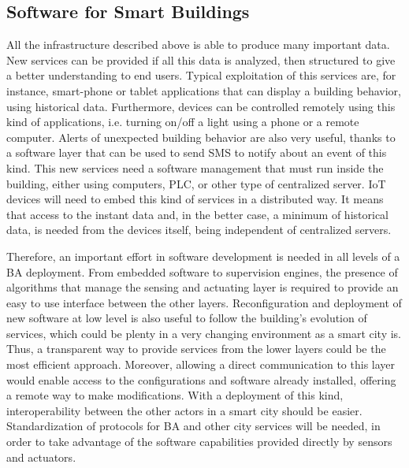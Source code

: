\subsection{Software for Smart Buildings}
All the infrastructure described above is able to produce many important data.
New services can be provided if all this data is analyzed, then structured to give a better understanding to end users.
Typical exploitation of this services are, for instance, smart-phone or tablet applications that can display a building behavior, using historical data.
Furthermore, devices can be controlled remotely using this kind of applications, i.e. turning on/off a light using a phone or a remote computer.
Alerts of unexpected building behavior are also very useful, thanks to a software layer that can be used to send SMS to notify about an event of this kind.
This new services need a software management that must run inside the building, either using computers, PLC, or other type of centralized server.
IoT devices will need to embed this kind of services in a distributed way.
It means that access to the instant data and, in the better case, a minimum of historical data, is needed from the devices itself, being independent of centralized servers.

Therefore, an important effort in software development is needed in all levels of a BA deployment.
From embedded software to supervision engines, the presence of algorithms that manage the sensing and actuating layer is required to provide an easy to use interface between the other layers.
Reconfiguration and deployment of new software at low level is also useful to follow the building's evolution of services, which could be plenty in a very changing environment as a smart city is.
Thus, a transparent way to provide services from the lower layers could be the most efficient approach.
Moreover, allowing a direct communication to this layer would enable access to the configurations and software already installed, offering a remote way to make modifications.
With a deployment of this kind, interoperability between the other actors in a smart city should be easier.
Standardization of protocols for BA and other city services will be needed, in order to take advantage of the software capabilities provided directly by sensors and actuators.

